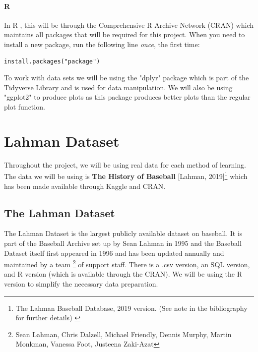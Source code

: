 \documentclass[11pt,a4paper]{report}
\begin{document}
\subsubsection{R}
In R \cite{R}, this will be through the Comprehensive R Archive Network (CRAN) which maintains all packages that will be required for this project. When you need to install a new package, run the following line \textit{once}, the first time:
\begin{lstlisting}
install.packages("package")
\end{lstlisting}
To work with data sets we will be using the "dplyr" \cite{dplyr} package which is part of the Tidyverse Library and is used for data manipulation. We will also be using "ggplot2" \cite{ggplot} to produce plots as this package produces better plots than the regular plot function.






\chapter{Lahman Dataset}
Throughout the project, we will be using real data for each method of learning. The data we will be using is \textbf{The History of Baseball} [Lahman, 2019]\footnote{The Lahman Baseball Database, 2019 version. (See note in the bibliography for further details) \cite{Lahman}} \cite{Lahman} which has been made available through Kaggle and CRAN.

\section{The Lahman Dataset}
The Lahman Dataset is the largest publicly available dataset on baseball. It is part of the Baseball Archive set up by Sean Lahman in 1995 and the Baseball Dataset itself first appeared in 1996 and has been updated annually and maintained by a team \cite{Lahman} \footnote{Sean Lahman, Chris Dalzell, Michael Friendly, Dennis Murphy, Martin Monkman, Vanessa Foot, Justeena Zaki-Azat} of support staff. There is a .csv version, an SQL version, and R version (which is available through the CRAN). We will be using the R version to simplify the necessary data preparation.
\end{document}
